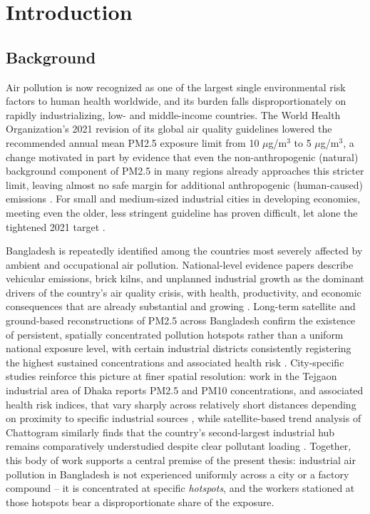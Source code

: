 \chapter{Introduction}
\label{ch:introduction}

\section{Background}
\label{sec:background}

Air pollution is now recognized as one of the largest single environmental risk factors to human health worldwide, and its burden falls disproportionately on rapidly industrializing, low- and middle-income countries. The World Health Organization's 2021 revision of its global air quality guidelines lowered the recommended annual mean PM2.5 exposure limit from 10 $\mu$g/m$^3$ to 5 $\mu$g/m$^3$, a change motivated in part by evidence that even the non-anthropogenic (natural) background component of PM2.5 in many regions already approaches this stricter limit, leaving almost no safe margin for additional anthropogenic (human-caused) emissions \citep{pai2022who}. For small and medium-sized industrial cities in developing economies, meeting even the older, less stringent guideline has proven difficult, let alone the tightened 2021 target \citep{polezer2023new}.

Bangladesh is repeatedly identified among the countries most severely affected by ambient and occupational air pollution. National-level evidence papers describe vehicular emissions, brick kilns, and unplanned industrial growth as the dominant drivers of the country's air quality crisis, with health, productivity, and economic consequences that are already substantial and growing \citep{khatun2023evidence}. Long-term satellite and ground-based reconstructions of PM2.5 across Bangladesh confirm the existence of persistent, spatially concentrated pollution hotspots rather than a uniform national exposure level, with certain industrial districts consistently registering the highest sustained concentrations and associated health risk \citep{ali2025longterm}. City-specific studies reinforce this picture at finer spatial resolution: work in the Tejgaon industrial area of Dhaka reports PM2.5 and PM10 concentrations, and associated health risk indices, that vary sharply across relatively short distances depending on proximity to specific industrial sources \citep{basak2025spatial}, while satellite-based trend analysis of Chattogram similarly finds that the country's second-largest industrial hub remains comparatively understudied despite clear pollutant loading \citep{huraira2024spatial}. Together, this body of work supports a central premise of the present thesis: industrial air pollution in Bangladesh is not experienced uniformly across a city or a factory compound -- it is concentrated at specific \emph{hotspots}, and the workers stationed at those hotspots bear a disproportionate share of the exposure.

